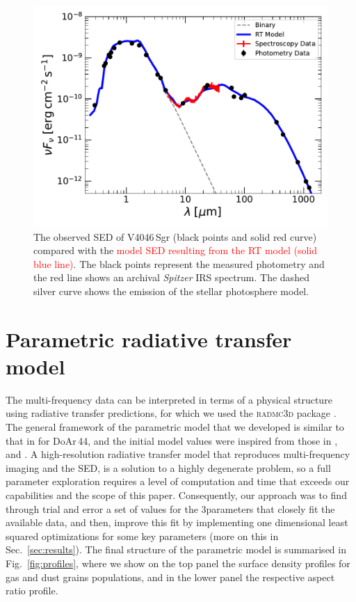 \documentclass[fleqn,usenatbib,useAMS]{mnras}
\newcommand{\red}[1]{\textcolor{red}{#1}}
\begin{document}
\begin{figure}
	\centering
	\includegraphics[width=\columnwidth]{SED_.pdf}
    \caption{The observed SED of V4046\,Sgr (black points and solid red curve) compared with the \red{model SED resulting from the RT model (solid blue line)}. The black points represent the measured photometry and the red line shows an archival \textit{Spitzer} IRS spectrum. The dashed silver curve shows the emission of the stellar photosphere model.}
    \label{fig:SED}
\end{figure}

\section{Parametric radiative transfer model} \label{sec:model}

The multi-frequency data can be interpreted in terms of a physical structure using radiative transfer predictions, for which we used the \textsc{radmc3d} package \citep[version 2.0,][]{Dullemond_2012}. The general framework of the parametric model that we developed is similar to that in \citet{2018MNRAS.477.5104C} for DoAr\,44, and the initial model values were inspired from those in \citet{Rosenfeld_2013}, \citet{Ru_z_Rodr_guez_2019} and \citet{2019ApJ...882..160Q}. A high-resolution radiative transfer model that reproduces multi-frequency imaging and the SED, is a solution to a highly degenerate problem, so a full parameter exploration requires a level of computation and time that exceeds our capabilities and the scope of this paper. Consequently, our approach was to find through trial and error a set of values for the 3parameters that closely fit the available data, and then, improve this fit by implementing one dimensional least squared optimizations for some key parameters (more on this in Sec.~\ref{sec:results}). The final structure of the parametric model is summarised in Fig.~\ref{fig:profiles}, where we show on the top panel the surface density profiles for gas and dust grains populations, and in the lower panel the respective aspect ratio profile.
\end{document}
